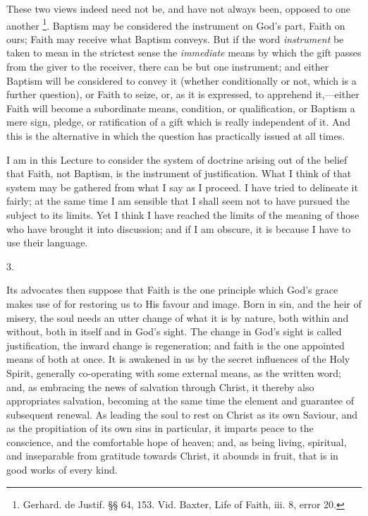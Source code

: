 These two views indeed need not be, and have not always been,
opposed to one another \footnote{Gerhard. de
Justif. §§ 64, 153. Vid. Baxter, Life of Faith, iii. 8, error 20.}. Baptism may be considered the
instrument on God's part, Faith on ours; Faith may receive what
Baptism conveys. But if the word \emph{instrument} be taken to mean in
the strictest sense the \emph{immediate} means by which the gift
passes from the giver to the receiver, there can be but one
instrument; and either Baptism will be considered to convey it
(whether conditionally or not, which is a further question), or Faith
to seize, or, as it is expressed, to apprehend it,—either Faith will
become a subordinate means, condition, or qualification, or Baptism a
mere sign, pledge, or ratification of a gift which is really
independent of it. And this is the alternative in which the question
has practically issued at all times.

I am in this Lecture to consider the system of doctrine arising out
of the belief that Faith, not Baptism, is the instrument of
justification. What I think of that system may be gathered from what I
say as I proceed. I have tried to delineate it fairly; at the same
time I am sensible that I shall seem not to have pursued the subject
to its limits. Yet I think I have reached the limits of the meaning of
those who have brought it into discussion; and if I am obscure, it is
because I have to use their language.

3.

Its advocates then suppose that Faith is the one principle which
God's grace makes use of for restoring us to His favour and image.
Born in sin, and the heir of misery, the soul needs an utter change of
what it is by nature, both within and without, both in itself and in
God's sight. The change in God's sight is called justification, the
inward change is regeneration; and faith is the one appointed means of
both at once. It is awakened in us by the secret influences of the
Holy Spirit, generally co-operating with some external means, as the
written word; and, as embracing the news of salvation through Christ,
it thereby also appropriates salvation, becoming at the same time the
element and guarantee of subsequent renewal. As leading the soul to
rest on Christ as its own Saviour, and as the propitiation of its own
sins in particular, it imparts peace to the conscience, and the
comfortable hope of heaven; and, as being living, spiritual, and
inseparable from gratitude towards Christ, it abounds in fruit, that
is in good works of every kind.

